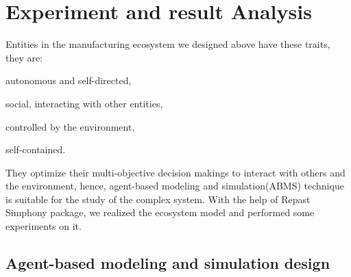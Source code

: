 \section{Experiment and result Analysis} %
\label{sec:Experiment_results}

Entities in the manufacturing ecosystem we designed above have these traits, they are: \begin{inparaenum}
\item autonomous and self-directed, 
\item social, interacting with other entities, 
\item controlled by the environment, 
\item self-contained.
\end{inparaenum} They optimize their multi-objective decision makings to interact with others and the environment, hence, agent-based modeling and simulation(ABMS) technique\cite{Macal2009,north2007managing} is suitable for the study of the complex system. With the help of Repast Simphony\cite{North2013} package, we realized the ecosystem model and performed some experiments on it.
\subsection{Agent-based modeling and simulation design} %
\label{sub:agent_based_modeling_and_simulation}
